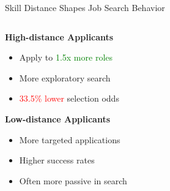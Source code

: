 \documentclass{beamer}
\begin{document}
\begin{frame}{Skill Distance Shapes Job Search Behavior}
\begin{columns}
\begin{column}{0.48\textwidth}
\textbf{High-distance Applicants}
\begin{itemize}
    \item Apply to \textcolor{green}{1.5x more roles}
    \item More exploratory search
    \item \textcolor{red}{33.5\% lower} selection odds
\end{itemize}

\textbf{Low-distance Applicants}
\begin{itemize}
    \item More targeted applications
    \item Higher success rates
    \item Often more passive in search
\end{itemize}
\end{column}
\begin{column}{0.48\textwidth}
\caption*{Distribution of Average Skill Distance}
\end{column}
\end{columns}
\end{frame}
\end{document}

